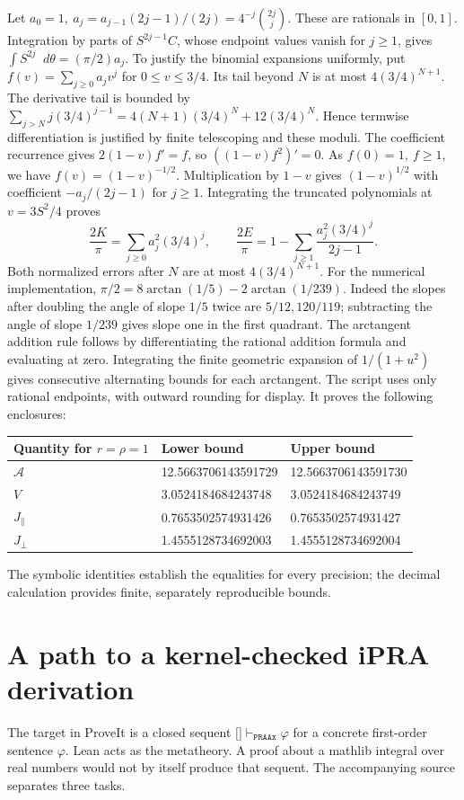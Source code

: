 \documentclass[11pt,letterpaper]{article}
\newcommand{\sect}[1]{\section[#1]{\color{ink}#1}}
\newcommand{\subt}[1]{\par\medskip\noindent{\color{sea}\bfseries #1}\enspace}
\newcommand{\dd}{\mathop{}\!d}
\newcommand{\ax}{\parallel}\newcommand{\tr}{\perp}
\begin{document}
\subt{Independent enclosures of the constants.}
Let \(a_0=1,\ a_j=a_{j-1}(2j-1)/(2j)=4^{-j}\binom{2j}{j}\). These are rationals in \([0,1]\). Integration by parts of \(S^{2j-1}C\), whose endpoint values vanish for \(j\ge1\), gives
\(\int S^{2j}\dd\theta=(\pi/2)a_j\). To justify the binomial expansions uniformly, put \(f(v)=\sum_{j\ge0}a_jv^j\) for \(0\le v\le3/4\). Its tail beyond \(N\) is at most \(4(3/4)^{N+1}\). The derivative tail is bounded by \(\sum_{j>N}j(3/4)^{j-1}=4(N+1)(3/4)^N+12(3/4)^N\). Hence termwise differentiation is justified by finite telescoping and these moduli. The coefficient recurrence gives \(2(1-v)f'=f\), so \(((1-v)f^2)'=0\). As \(f(0)=1,\ f\ge1\), we have \(f(v)=(1-v)^{-1/2}\). Multiplication by \(1-v\) gives \((1-v)^{1/2}\) with coefficient \(-a_j/(2j-1)\) for \(j\ge1\). Integrating the truncated polynomials at \(v=3S^2/4\) proves
\[
 \frac{2K}{\pi}=\sum_{j\ge0}a_j^2(3/4)^j,\qquad
 \frac{2E}{\pi}=1-\sum_{j\ge1}\frac{a_j^2(3/4)^j}{2j-1}.
\]
Both normalized errors after \(N\) are at most \(4(3/4)^{N+1}\). For the numerical implementation, \(\pi/2=8\arctan(1/5)-2\arctan(1/239)\). Indeed the slopes after doubling the angle of slope \(1/5\) twice are \(5/12,120/119\); subtracting the angle of slope \(1/239\) gives slope one in the first quadrant. The arctangent addition rule follows by differentiating the rational addition formula and evaluating at zero. Integrating the finite geometric expansion of \(1/(1+u^2)\) gives consecutive alternating bounds for each arctangent. The script uses only rational endpoints, with outward rounding for display. It proves the following enclosures:
\begin{center}
\begin{tabular}{@{}lll@{}}\toprule
Quantity for \(r=\rho=1\)& Lower bound & Upper bound\\ \midrule
\(\mathcal A\) & 12.5663706143591729 & 12.5663706143591730\\
\(V\) & 3.0524184684243748 & 3.0524184684243749\\
\(J_\ax\) & 0.7653502574931426 & 0.7653502574931427\\
\(J_\tr\) & 1.4555128734692003 & 1.4555128734692004\\ \bottomrule
\end{tabular}
\end{center}
The symbolic identities establish the equalities for every precision; the decimal calculation provides finite, separately reproducible bounds.

\newpage
\sect{A path to a kernel-checked iPRA derivation}\label{sec:lean}
The target in ProveIt \cite{ProveIt} is a closed sequent
\(\texttt{[]}\vdash_{\texttt{PRAAx}}\varphi\) for a concrete first-order sentence \(\varphi\).
Lean acts as the metatheory. A proof about a mathlib integral over real numbers would not by itself produce that sequent. The accompanying source separates three tasks.
\end{document}

